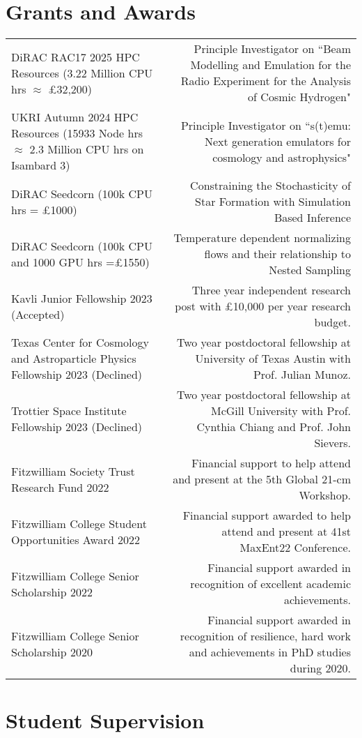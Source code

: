 \documentclass{article}
\begin{document}
\section*{Grants and Awards}

\begin{tabular}{l!{\vrule}r}
    DiRAC RAC17 2025 HPC Resources (3.22 Million CPU hrs $\approx$ £32,200) & Principle Investigator on ``Beam Modelling and Emulation for the Radio Experiment for the Analysis of Cosmic Hydrogen"\\
    UKRI Autumn 2024 HPC Resources (15933 Node hrs $\approx$ 2.3 Million CPU hrs on Isambard 3) & Principle Investigator on ``s(t)emu: Next generation emulators for cosmology and astrophysics" \\
    DiRAC Seedcorn (100k CPU hrs = £1000) & Constraining the Stochasticity of Star Formation with Simulation Based Inference \\
    DiRAC Seedcorn (100k CPU and 1000 GPU hrs =£1550) & Temperature dependent normalizing flows and their relationship to Nested Sampling \\
    Kavli Junior Fellowship 2023 (Accepted) & Three year independent research post with £10,000 per year research budget. \\
    Texas Center for Cosmology and Astroparticle Physics Fellowship 2023 (Declined) & Two year postdoctoral fellowship at University of Texas Austin with Prof. Julian Munoz. \\
    Trottier Space Institute Fellowship 2023 (Declined) & Two year postdoctoral fellowship at McGill University with Prof. Cynthia Chiang and Prof. John Sievers. \\
    Fitzwilliam Society Trust Research Fund 2022 & Financial support to help attend and present at the 5th Global 21-cm Workshop. \\
	Fitzwilliam College Student Opportunities Award 2022 & Financial support awarded to help attend and present at 41st MaxEnt22 Conference. \\
	Fitzwilliam College Senior Scholarship 2022 & Financial support awarded in recognition of excellent academic achievements. \\
	Fitzwilliam College Senior Scholarship 2020 & Financial support awarded in recognition of resilience, hard work and achievements in PhD studies during 2020.
\end{tabular}

\section*{Student Supervision}
\end{document}
